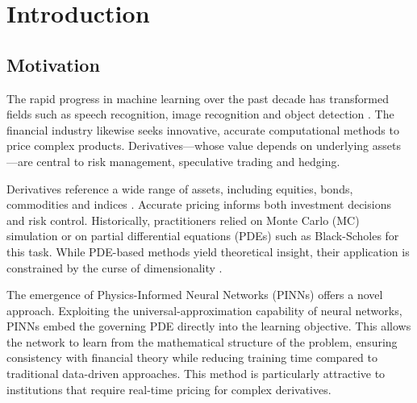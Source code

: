 \documentclass[12pt]{report} %
\theoremstyle{plain} %
\theoremstyle{definition} %
\theoremstyle{remark} %
\begin{document}
	\newpage %
	\thispagestyle{empty}
	\mbox{}
	


\tableofcontents
\thispagestyle{fancy}

\newpage %
\thispagestyle{empty}
\mbox{}

\listoffigures
\thispagestyle{fancy}

\newpage %
\thispagestyle{empty}
\mbox{}

\listoftables
\thispagestyle{fancy}

\newpage %
\thispagestyle{empty}
\mbox{}


\clearpage
{} %

\chapter{Introduction}

\section{Motivation}

The rapid progress in machine learning over the past decade has transformed
fields such as speech recognition, image recognition and object detection \cite{lecun}.
The financial industry likewise seeks innovative, accurate computational methods
to price complex products. Derivatives—whose value depends on underlying assets
\cite{alma99148840908702021}—are central to risk management, speculative trading and hedging.

Derivatives reference a wide range of assets, including equities, bonds, commodities and indices
\cite{Wilmott2010PaulWO}. Accurate pricing informs both investment decisions and risk control.
Historically, practitioners relied on Monte Carlo (MC) simulation \cite{glasserman2004monte} or
on partial differential equations (PDEs) such as Black-Scholes \cite{blackscholes} for this task.
While PDE-based methods yield theoretical insight, their application is constrained by the curse of dimensionality \cite{bellman1966dynamic}.

The emergence of Physics-Informed Neural Networks (PINNs) \cite{RAISSI2019686}
offers a novel approach. Exploiting the universal-approximation capability of neural networks,
PINNs embed the governing PDE directly into the learning objective. This allows
the network to learn from the mathematical structure of the problem, ensuring consistency
with financial theory while reducing training time compared to traditional data-driven approaches. This method is particularly attractive to
institutions that require real-time pricing for complex derivatives.
\end{document}
